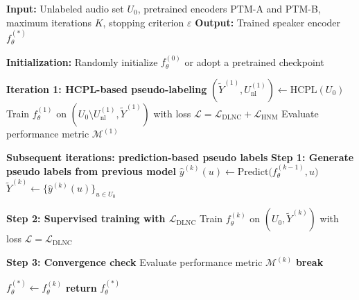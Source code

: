 \documentclass[lettersize,journal]{IEEEtran}
\begin{document}
\begin{algorithm}[t]
\caption{Iterative Unsupervised Speaker Verification Training with HCPL Initialization}
\label{alg:alg2}
\begin{algorithmic}
\STATE 
\STATE \textbf{Input:} Unlabeled audio set $U_{0}$, pretrained encoders PTM-A and PTM-B, maximum iterations $K$, stopping criterion $\varepsilon$
\STATE \textbf{Output:} Trained speaker encoder $f_{\theta}^{(*)}$

\STATE 
\STATE \textbf{Initialization:} Randomly initialize $f_{\theta}^{(0)}$ or adopt a pretrained checkpoint

\STATE 
\STATE \textbf{Iteration 1: HCPL-based pseudo-labeling}
\STATE $(\tilde{Y}^{(1)}, U_{\mathrm{nl}}^{(1)}) \gets \mathrm{HCPL}(U_{0})$ \hfill {}
\STATE Train $f_{\theta}^{(1)}$ on $(U_{0} \setminus U_{\mathrm{nl}}^{(1)}, \tilde{Y}^{(1)})$ with loss
\STATE \hspace{0.8cm} $\mathcal{L} = \mathcal{L}_{\mathrm{DLNC}} + \mathcal{L}_{\mathrm{HNM}}$
\STATE Evaluate performance metric $\mathcal{M}^{(1)}$

\STATE 
\STATE \textbf{Subsequent iterations: prediction-based pseudo labels}
    \STATE \textbf{Step 1: Generate pseudo labels from previous model}
        \STATE $\hat{y}^{(k)}(u) \gets \mathrm{Predict}\big(f_{\theta}^{(k-1)}, u\big)$
    \ENDFOR
    \STATE $\tilde{Y}^{(k)} \gets \{\hat{y}^{(k)}(u)\}_{u \in U_{0}}$
    
    \STATE 
    \STATE \textbf{Step 2: Supervised training with $\mathcal{L}_{\mathrm{DLNC}}$}
    \STATE Train $f_{\theta}^{(k)}$ on $(U_{0}, \tilde{Y}^{(k)})$ with loss
    \STATE \hspace{0.8cm} $\mathcal{L} = \mathcal{L}_{\mathrm{DLNC}}$
    
    \STATE 
    \STATE \textbf{Step 3: Convergence check}
    \STATE Evaluate performance metric $\mathcal{M}^{(k)}$
        \STATE \textbf{break}
    \ENDIF
\ENDFOR

\STATE 
\STATE $f_{\theta}^{(*)} \gets f_{\theta}^{(k)}$
\STATE \textbf{return} $f_{\theta}^{(*)}$

\end{algorithmic}
\end{algorithm}
\end{document}
